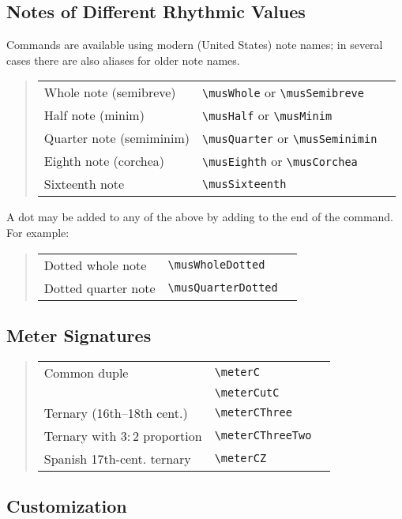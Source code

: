 \documentclass{article}
\newenvironment{codetable}
{\begin{quote}\begin{tabular}{lll}}
{\end{tabular}\end{quote}}
\begin{document}
\subsection{Notes of Different Rhythmic Values}

Commands are available using modern (United States) note names; in several cases
there are also aliases for older note names.

\begin{codetable}
    Whole note (semibreve) & \verb|\musWhole| or \verb|\musSemibreve| &
    \musWhole\\
    Half note (minim) & \verb|\musHalf| or \verb|\musMinim| & \musHalf\\
    Quarter note (semiminim) & \verb|\musQuarter| or \verb|\musSeminimin| &
    \musQuarter\\
    Eighth note (corchea) & \verb|\musEighth| or \verb|\musCorchea| &
    \musEighth\\
    Sixteenth note & \verb|\musSixteenth| & \musSixteenth\\
\end{codetable}

A dot may be added to any of the above by adding  to the end of the
command. For example:

\begin{codetable}
    Dotted whole note & \verb|\musWholeDotted| & \musWholeDotted\\
    Dotted quarter note & \verb|\musQuarterDotted| & \musQuarterDotted\\
\end{codetable}

\subsection{Meter Signatures}

\begin{codetable}
    Common duple & \verb|\meterC| & \meterC\\
    \term{Alla breve} & \verb|\meterCutC| & \meterCutC\\
    Ternary (16th--18th cent.) & \verb|\meterCThree| & \meterCThree\\
    Ternary with $3:2$ proportion & \verb|\meterCThreeTwo| &
    \meterCThreeTwo\\
    Spanish 17th-cent. ternary & \verb|\meterCZ| & \meterCZ\\
\end{codetable}

\subsection{Customization}
\end{document}
